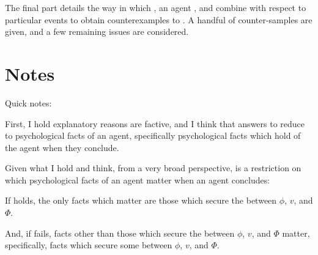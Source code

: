 \begin{note}
\begin{TOCEnum}
    The final part details the way in which , an agent , and \requ{} combine with respect to particular events to obtain counterexamples to \issueInclusion{}.
    A handful of counter-samples are given, and a few remaining issues are considered.
  \end{TOCEnum}
\end{note}



\section*{Notes}


\begin{note}
  Quick notes:

  First, I hold explanatory reasons are factive, and I think that answers to \qWhy{} reduce to psychological facts of an agent, specifically psychological facts which hold of the agent when they conclude.%


  Given what I hold and think, from a very broad perspective, \issueInclusion{} is a restriction on which psychological facts of an agent matter when an agent concludes:

  If \issueInclusion{} holds, the only facts which matter are those which secure the \ros{} between \(\phi\), \(v\), and \(\Phi\).

  And, if \issueInclusion{} fails, facts other than those which secure the \ros{} between \(\phi\), \(v\), and \(\Phi\) matter, specifically, facts which secure some \ros{} between \(\phi\), \(v\), and \(\Phi\).
\end{note}


